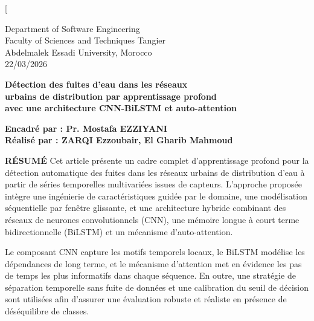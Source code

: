 \twocolumn[{
\begin{flushleft}
{\small
Department of Software Engineering\\
Faculty of Sciences and Techniques Tangier\\
Abdelmalek Essadi University, Morocco\\
22/03/2026\par

\vspace{2.5em}

{\color{titleblue}\Huge\bfseries Détection des fuites d'eau dans les réseaux\\[0.2em]
urbains de distribution par apprentissage profond\\[0.2em]
avec une architecture CNN-BiLSTM et auto-attention\\[0.2em]
\par}

\vspace{1.5em}

{\large\bfseries Encadré par : Pr. Mostafa EZZIYANI\\[0.8em]
Réalisé par : ZARQI Ezzoubair, El Gharib Mahmoud\par}

}
\end{flushleft}

\vspace{1.5em}

\begin{leftbar}
\textbf{\textcolor{headingblue}{RÉSUMÉ}} Cet article présente un cadre complet
d'apprentissage profond pour la détection automatique des fuites dans les réseaux
urbains de distribution d'eau à partir de séries temporelles multivariées issues
de capteurs. L'approche proposée intègre une ingénierie de caractéristiques guidée
par le domaine, une modélisation séquentielle par fenêtre glissante, et une
architecture hybride combinant des réseaux de neurones convolutionnels (CNN),
une mémoire longue à court terme bidirectionnelle (BiLSTM) et un mécanisme
d'auto-attention.

Le composant CNN capture les motifs temporels locaux, le BiLSTM modélise les
dépendances de long terme, et le mécanisme d'attention met en évidence les pas
de temps les plus informatifs dans chaque séquence. En outre, une stratégie de
séparation temporelle sans fuite de données et une calibration du seuil de
décision sont utilisées afin d'assurer une évaluation robuste et réaliste en
présence de déséquilibre de classes.


\end{leftbar}}
